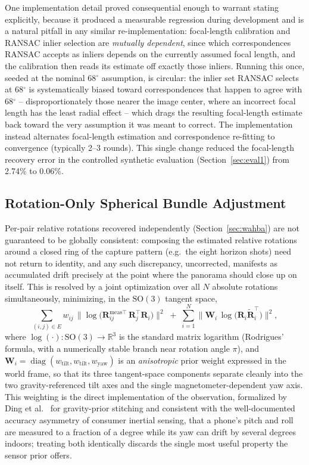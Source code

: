 \documentclass[11pt]{article}
\newcommand{\SO}{\mathrm{SO}(3)}
\newcommand{\R}{\mathbb{R}}
\newcommand{\mat}[1]{\mathbf{#1}}
\newcommand{\Deg}{\ensuremath{^{\circ}}}
\begin{document}
One implementation detail proved consequential enough to warrant stating explicitly, because it produced a measurable regression during development and is a natural pitfall in any similar re-implementation: focal-length calibration and RANSAC inlier selection are \emph{mutually dependent}, since which correspondences RANSAC accepts as inliers depends on the currently assumed focal length, and the calibration then reads its estimate off exactly those inliers. Running this once, seeded at the nominal $68\Deg$ assumption, is circular: the inlier set RANSAC selects at $68\Deg$ is systematically biased toward correspondences that happen to agree with $68\Deg$ -- disproportionately those nearer the image center, where an incorrect focal length has the least radial effect -- which drags the resulting focal-length estimate back toward the very assumption it was meant to correct. The implementation instead alternates focal-length estimation and correspondence re-fitting to convergence (typically 2--3 rounds). This single change reduced the focal-length recovery error in the controlled synthetic evaluation (Section~\ref{sec:eval1}) from 2.74\% to 0.06\%.

\subsection{Rotation-Only Spherical Bundle Adjustment}
\label{sec:ba}

Per-pair relative rotations recovered independently (Section~\ref{sec:wahba}) are not guaranteed to be globally consistent: composing the estimated relative rotations around a closed ring of the capture pattern (e.g.\ the eight horizon shots) need not return to identity, and any such discrepancy, uncorrected, manifests as accumulated drift precisely at the point where the panorama should close up on itself. This is resolved by a joint optimization over all $N$ absolute rotations simultaneously, minimizing, in the $\SO$ tangent space,
\begin{equation}
\sum_{(i,j)\in E} w_{ij}\, \bigl\| \log\!\bigl(\mat{R}^{\mathrm{meas}\top}_{ij}\, \mat{R}_j^{\!\top}\mat{R}_i\bigr) \bigr\|^2
\;+\;
\sum_{i=1}^{N} \bigl\| \mat{W}_i\, \log\!\bigl(\mat{R}_i \tilde{\mat{R}}_i^{\!\top}\bigr) \bigr\|^2,
\label{eq:bundlecost}
\end{equation}
where $\log(\cdot): \SO \to \R^3$ is the standard matrix logarithm (Rodrigues' formula, with a numerically stable branch near rotation angle $\pi$), and $\mat{W}_i = \operatorname{diag}(w_{\mathrm{tilt}}, w_{\mathrm{tilt}}, w_{\mathrm{yaw}})$ is an \emph{anisotropic} prior weight expressed in the world frame, so that its three tangent-space components separate cleanly into the two gravity-referenced tilt axes and the single magnetometer-dependent yaw axis. This weighting is the direct implementation of the observation, formalized by Ding et al.~\cite{ding2021gravity} for gravity-prior stitching and consistent with the well-documented accuracy asymmetry of consumer inertial sensing, that a phone's pitch and roll are measured to a fraction of a degree while its yaw can drift by several degrees indoors; treating both identically discards the single most useful property the sensor prior offers.
\end{document}

